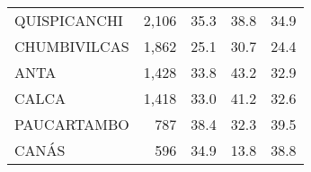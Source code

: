 \begin{tabular}{lrrrr}
	\cellcolor[HTML]{FD6864}QUISPICANCHI                                    & 2,106                                                                 & 35.3                                                                             & 38.8                                                                        & 34.9                                                                                \\
	\cellcolor[HTML]{FD6864}CHUMBIVILCAS                                    & 1,862                                                                 & 25.1                                                                             & 30.7                                                                        & 24.4                                                                                \\
	\cellcolor[HTML]{FD6864}ANTA                                            & 1,428                                                                 & 33.8                                                                             & 43.2                                                                        & 32.9                                                                                \\
	\cellcolor[HTML]{FD6864}CALCA                                           & 1,418                                                                 & 33.0                                                                             & 41.2                                                                        & 32.6                                                                                \\
	\cellcolor[HTML]{FD6864}PAUCARTAMBO                                     & 787                                                                   & 38.4                                                                             & 32.3                                                                        & 39.5                                                                                \\
	\cellcolor[HTML]{FD6864}CANÁS                                           & 596                                                                   & 34.9                                                                             & 13.8                                                                        & 38.8                                                                                \\

\end{tabular}
